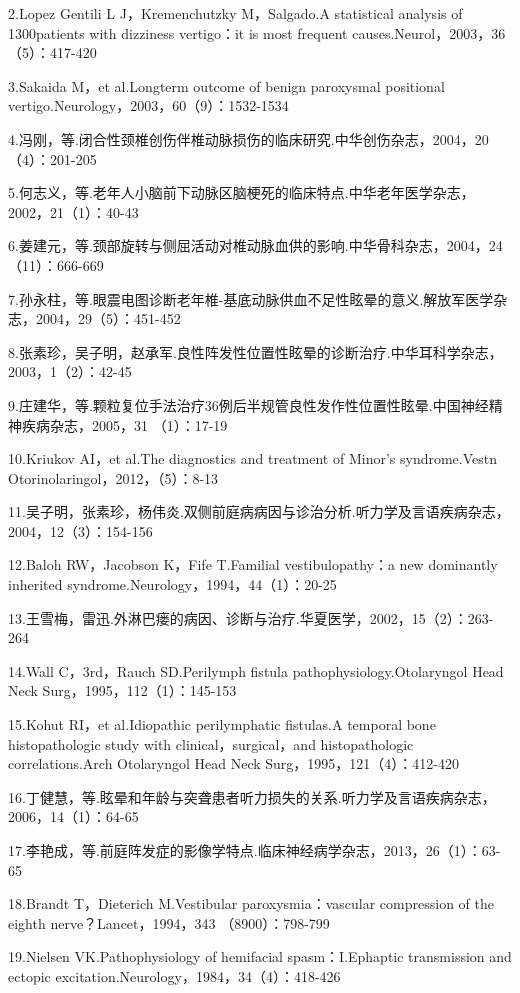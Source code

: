 2.Lopez Gentili L J，Kremenchutzky M，Salgado.A statistical analysis of
1300patients with dizziness vertigo：it is most frequent
causes.Neurol，2003，36（5）：417-420

3.Sakaida M，et al.Longterm outcome of benign paroxysmal positional
vertigo.Neurology，2003，60（9）：1532-1534

4.冯刚，等.闭合性颈椎创伤伴椎动脉损伤的临床研究.中华创伤杂志，2004，20（4）：201-205

5.何志义，等.老年人小脑前下动脉区脑梗死的临床特点.中华老年医学杂志，2002，21（1）：40-43

6.姜建元，等.颈部旋转与侧屈活动对椎动脉血供的影响.中华骨科杂志，2004，24（11）：666-669

7.孙永柱，等.眼震电图诊断老年椎-基底动脉供血不足性眩晕的意义.解放军医学杂志，2004，29（5）：451-452

8.张素珍，吴子明，赵承军.良性阵发性位置性眩晕的诊断治疗.中华耳科学杂志，2003，1（2）：42-45

9.庄建华，等.颗粒复位手法治疗36例后半规管良性发作性位置性眩晕.中国神经精神疾病杂志，2005，31
（1）：17-19

10.Kriukov AI，et al.The diagnostics and treatment of Minor's
syndrome.Vestn Otorinolaringol，2012，（5）：8-13

11.吴子明，张素珍，杨伟炎.双侧前庭病病因与诊治分析.听力学及言语疾病杂志，2004，12（3）：154-156

12.Baloh RW，Jacobson K，Fife T.Familial vestibulopathy：a new
dominantly inherited syndrome.Neurology，1994，44（1）：20-25

13.王雪梅，雷迅.外淋巴瘘的病因、诊断与治疗.华夏医学，2002，15（2）：263-264

14.Wall C，3rd，Rauch SD.Perilymph fistula pathophysiology.Otolaryngol
Head Neck Surg，1995，112（1）：145-153

15.Kohut RI，et al.Idiopathic perilymphatic fistulas.A temporal bone
histopathologic study with clinical，surgical，and histopathologic
correlations.Arch Otolaryngol Head Neck Surg，1995，121（4）：412-420

16.丁健慧，等.眩晕和年龄与突聋患者听力损失的关系.听力学及言语疾病杂志，2006，14（1）：64-65

17.李艳成，等.前庭阵发症的影像学特点.临床神经病学杂志，2013，26（1）：63-65

18.Brandt T，Dieterich M.Vestibular paroxysmia：vascular compression of
the eighth nerve？Lancet，1994，343 （8900）：798-799

19.Nielsen VK.Pathophysiology of hemifacial spasm：I.Ephaptic
transmission and ectopic excitation.Neurology，1984，34（4）：418-426

